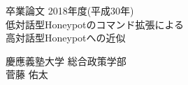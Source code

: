 \begin{titlepage}
  \begin{center}
    \begin{large}
      卒業論文   2018年度(平成30年)\\
      \vspace{24pt}
      低対話型Honeypotのコマンド拡張による\\高対話型Honeypotへの近似
      \end{large}
  \end{center}
  \vspace{40em}
  \begin{flushright}
    \large 慶應義塾大学 総合政策学部\\
    菅藤 佑太
  \end{flushright}
\end{titlepage}
